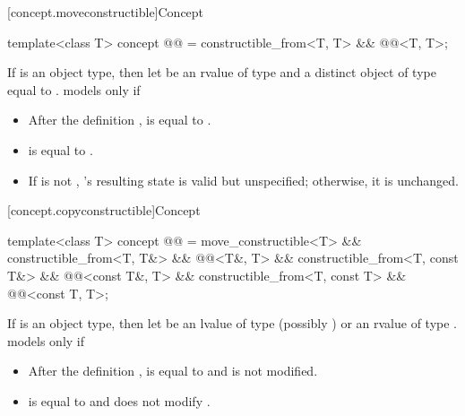[concept.moveconstructible]{Concept }

\begin{itemdecl}
template<class T>
  concept @@ = constructible_from<T, T> && @@<T, T>;
\end{itemdecl}

\begin{itemdescr}
\pnum
If  is an object type, then let  be an rvalue of type
 and  a distinct object of type  equal to
.  models  only if

\begin{itemize}
\item After the definition ,  is equal to .

\item {} is equal to .

\item If  is not , 's resulting state is valid
but unspecified; otherwise, it is unchanged.
\end{itemize}
\end{itemdescr}

[concept.copyconstructible]{Concept }

\begin{itemdecl}
template<class T>
  concept @@ =
    move_constructible<T> &&
    constructible_from<T, T&> && @@<T&, T> &&
    constructible_from<T, const T&> && @@<const T&, T> &&
    constructible_from<T, const T> && @@<const T, T>;
\end{itemdecl}

\begin{itemdescr}
\pnum
If  is an object type, then let  be an lvalue of type
(possibly )  or an rvalue of type .
 models  only if

\begin{itemize}
\item After the definition ,
 is equal to  and
 is not modified.

\item {} is equal to  and does not modify .
\end{itemize}

\end{itemdescr}

